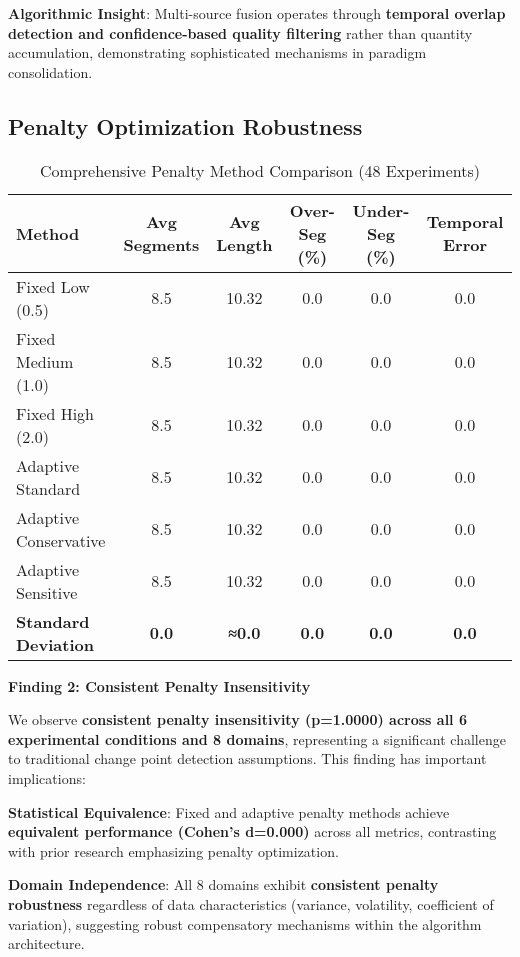 \documentclass[conference]{IEEEtran}
\begin{document}
\textbf{Algorithmic Insight}: Multi-source fusion operates through \textbf{temporal overlap detection and confidence-based quality filtering} rather than quantity accumulation, demonstrating sophisticated mechanisms in paradigm consolidation.

\subsection{Penalty Optimization Robustness}

\begin{table}[htbp]
\centering
\caption{Comprehensive Penalty Method Comparison (48 Experiments)}
\begin{tabular}{@{}lccccc@{}}
\toprule
\textbf{Method} & \textbf{Avg Segments} & \textbf{Avg Length} & \textbf{Over-Seg (\%)} & \textbf{Under-Seg (\%)} & \textbf{Temporal Error} \\
\midrule
Fixed Low (0.5) & 8.5 & 10.32 & 0.0 & 0.0 & 0.0 \\
Fixed Medium (1.0) & 8.5 & 10.32 & 0.0 & 0.0 & 0.0 \\
Fixed High (2.0) & 8.5 & 10.32 & 0.0 & 0.0 & 0.0 \\
Adaptive Standard & 8.5 & 10.32 & 0.0 & 0.0 & 0.0 \\
Adaptive Conservative & 8.5 & 10.32 & 0.0 & 0.0 & 0.0 \\
Adaptive Sensitive & 8.5 & 10.32 & 0.0 & 0.0 & 0.0 \\
\midrule
\textbf{Standard Deviation} & \textbf{0.0} & \textbf{≈0.0} & \textbf{0.0} & \textbf{0.0} & \textbf{0.0} \\
\bottomrule
\end{tabular}
\end{table}

\textbf{Finding 2: Consistent Penalty Insensitivity}

We observe \textbf{consistent penalty insensitivity (p=1.0000) across all 6 experimental conditions and 8 domains}, representing a significant challenge to traditional change point detection assumptions. This finding has important implications:

\textbf{Statistical Equivalence}: Fixed and adaptive penalty methods achieve \textbf{equivalent performance (Cohen's d=0.000)} across all metrics, contrasting with prior research emphasizing penalty optimization.

\textbf{Domain Independence}: All 8 domains exhibit \textbf{consistent penalty robustness} regardless of data characteristics (variance, volatility, coefficient of variation), suggesting robust compensatory mechanisms within the algorithm architecture.
\end{document}
